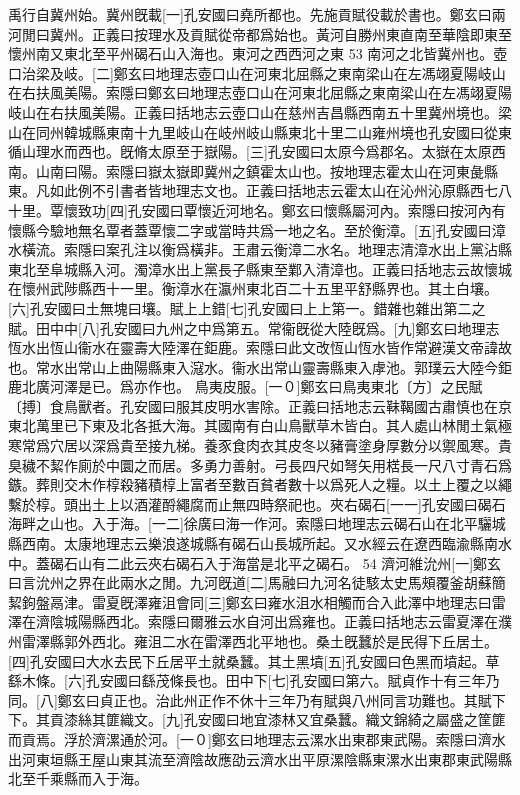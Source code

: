 禹行自冀州始。冀州旣載[一]孔安國曰堯所都也。先施貢賦役載於書也。鄭玄曰兩河閒曰冀州。正義曰按理水及貢賦從帝都爲始也。黃河自勝州東直南至華陰即東至懷州南又東北至平州碣石山入海也。東河之西西河之東
53
南河之北皆冀州也。壺口治梁及岐。[二]鄭玄曰地理志壺口山在河東北屈縣之東南梁山在左馮翊夏陽岐山在右扶風美陽。索隱曰鄭玄曰地理志壺口山在河東北屈縣之東南梁山在左馮翊夏陽岐山在右扶風美陽。正義曰括地志云壺口山在慈州吉昌縣西南五十里冀州境也。梁山在同州韓城縣東南十九里岐山在岐州岐山縣東北十里二山雍州境也孔安國曰從東循山理水而西也。旣脩太原至于嶽陽。[三]孔安國曰太原今爲郡名。太嶽在太原西南。山南曰陽。索隱曰嶽太嶽即冀州之鎮霍太山也。按地理志霍太山在河東彘縣東。凡如此例不引書者皆地理志文也。正義曰括地志云霍太山在沁州沁原縣西七八十里。覃懷致功[四]孔安國曰覃懷近河地名。鄭玄曰懷縣屬河內。索隱曰按河內有懷縣今驗地無名覃者蓋覃懷二字或當時共爲一地之名。至於衡漳。[五]孔安國曰漳水橫流。索隱曰案孔注以衡爲橫非。王肅云衡漳二水名。地理志清漳水出上黨沾縣東北至阜城縣入河。濁漳水出上黨長子縣東至鄴入清漳也。正義曰括地志云故懷城在懷州武陟縣西十一里。衡漳水在瀛州東北百二十五里平舒縣界也。其土白壤。[六]孔安國曰土無塊曰壤。賦上上錯[七]孔安國曰上上第一。錯雜也雜出第二之賦。田中中[八]孔安國曰九州之中爲第五。常衞旣從大陸旣爲。[九]鄭玄曰地理志恆水出恆山衞水在靈壽大陸澤在鉅鹿。索隱曰此文改恆山恆水皆作常避漢文帝諱故也。常水出常山上曲陽縣東入滱水。衞水出常山靈壽縣東入虖池。郭璞云大陸今鉅鹿北廣河澤是已。爲亦作也。 鳥夷皮服。[一０]鄭玄曰鳥夷東北〔方〕之民賦〔搏〕食鳥獸者。孔安國曰服其皮明水害除。正義曰括地志云靺鞨國古肅慎也在京東北萬里已下東及北各抵大海。其國南有白山鳥獸草木皆白。其人處山林閒土氣極寒常爲穴居以深爲貴至接九梯。養豕食肉衣其皮冬以豬膏塗身厚數分以禦風寒。貴臭穢不絜作廁於中圜之而居。多勇力善射。弓長四尺如弩矢用楛長一尺八寸青石爲鏃。葬則交木作椁殺豬積椁上富者至數百貧者數十以爲死人之糧。以土上覆之以繩繫於椁。頭出土上以酒灌酹繩腐而止無四時祭祀也。夾右碣石[一一]孔安國曰碣石海畔之山也。入于海。[一二]徐廣曰海一作河。索隱曰地理志云碣石山在北平驪城縣西南。太康地理志云樂浪遂城縣有碣石山長城所起。又水經云在遼西臨渝縣南水中。蓋碣石山有二此云夾右碣石入于海當是北平之碣石。
54
濟河維沇州[一]鄭玄曰言沇州之界在此兩水之閒。九河旣道[二]馬融曰九河名徒駭太史馬頰覆釜胡蘇簡絜鉤盤鬲津。雷夏旣澤雍沮會同[三]鄭玄曰雍水沮水相觸而合入此澤中地理志曰雷澤在濟陰城陽縣西北。索隱曰爾雅云水自河出爲雍也。正義曰括地志云雷夏澤在濮州雷澤縣郭外西北。雍沮二水在雷澤西北平地也。桑土旣蠶於是民得下丘居土。[四]孔安國曰大水去民下丘居平土就桑蠶。其土黑墳[五]孔安國曰色黑而墳起。草繇木條。[六]孔安國曰繇茂條長也。田中下[七]孔安國曰第六。賦貞作十有三年乃同。[八]鄭玄曰貞正也。治此州正作不休十三年乃有賦與八州同言功難也。其賦下下。其貢漆絲其篚織文。[九]孔安國曰地宜漆林又宜桑蠶。織文錦綺之屬盛之筐篚而貢焉。浮於濟漯通於河。[一０]鄭玄曰地理志云漯水出東郡東武陽。索隱曰濟水出河東垣縣王屋山東其流至濟陰故應劭云濟水出平原漯陰縣東漯水出東郡東武陽縣北至千乘縣而入于海。
